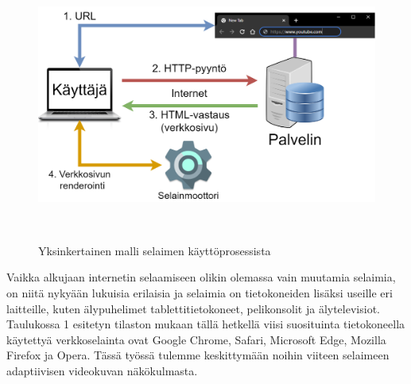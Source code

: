 \documentclass[finnish, 12pt, a4paper, elec, utf8, a-1b, online]{aaltothesis}
\begin{document}
\begin{figure}[htb]
  \centering
  \includegraphics[height=9cm]{./img/browser.png}
  \caption{Yksinkertainen malli selaimen käyttöprosessista \label{kuva1}}
\end{figure}

Vaikka alkujaan internetin selaamiseen olikin olemassa vain muutamia selaimia, on niitä nykyään lukuisia erilaisia ja selaimia on tietokoneiden lisäksi useille eri laitteille, kuten älypuhelimet tablettitietokoneet, pelikonsolit ja älytelevisiot. Taulukossa 1 esitetyn tilaston mukaan tällä hetkellä viisi suosituinta tietokoneella käytettyä verkkoselainta ovat Google Chrome, Safari, Microsoft Edge, Mozilla Firefox ja Opera. Tässä työssä tulemme keskittymään noihin viiteen selaimeen adaptiivisen videokuvan näkökulmasta.

\begin{table}[htb]
  \caption{Verkkoselainten markkinaosuus tietokonekäytössä helmikuussa 2022 StatCounterin mukaan. \cite{StatCounter} \label{taulukko1}}
  \centering
\end{table}
\end{document}
